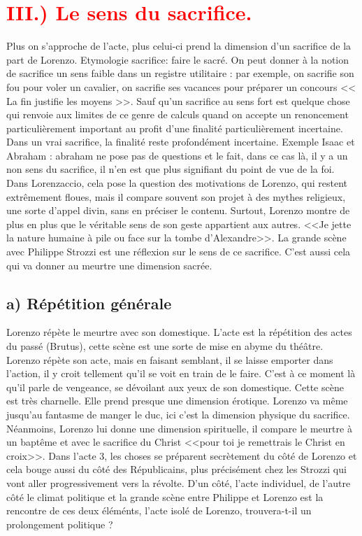 \documentclass[12pt]{article}
\begin{document}
\section*{\textcolor{red}{III.) Le sens du sacrifice.}}
Plus on s'approche de l'acte, plus celui-ci prend la dimension d'un sacrifice de la part de Lorenzo.
Etymologie sacrifice: faire le sacré. On peut donner à la notion de sacrifice un sens faible dans un registre utilitaire : par exemple, on sacrifie son fou pour voler un cavalier, on sacrifie ses vacances pour préparer un concours << La fin justifie les moyens >>.
Sauf qu'un sacrifice au sens fort est quelque chose qui renvoie aux limites de ce genre de calculs quand on accepte un renoncement particulièrement important au profit d'une finalité particulièrement incertaine.
Dans un vrai sacrifice, la finalité reste profondément incertaine.
Exemple Isaac et Abraham : abraham ne pose pas de questions et le fait, dans ce cas là, il y a un non sens du sacrifice, il n'en est que plus signifiant du point de vue de la foi.
Dans Lorenzaccio, cela pose la question des motivations de Lorenzo,  qui restent extrêmement floues, mais il compare souvent son projet à des mythes religieux, une sorte d'appel divin, sans en préciser le contenu.
Surtout, Lorenzo montre de plus en plus que le véritable sens de son geste appartient aux autres. <<Je jette la nature humaine à pile ou face sur la tombe d'Alexandre>>.
La grande scène avec Philippe Strozzi est une réflexion sur le sens de ce sacrifice.
C'est aussi cela qui va donner au meurtre une dimension sacrée.
\subsection*{a) Répétition générale}
Lorenzo répète le meurtre avec son domestique.
L'acte est la répétition des actes du passé (Brutus), cette scène est une sorte de mise en abyme du théâtre.
Lorenzo répète son acte, mais en faisant semblant, il se laisse emporter dans l'action, il y croit tellement qu'il se voit en train de le faire.
C'est à ce moment là qu'il parle de vengeance, se dévoilant aux yeux de son domestique. Cette scène est très charnelle.
Elle prend presque une dimension érotique.
Lorenzo va même jusqu'au fantasme de manger le duc, ici c'est la dimension physique du sacrifice.
Néanmoins, Lorenzo lui donne une dimension spirituelle, il compare le meurtre à un baptême et avec le sacrifice du Christ <<pour toi je remettrais le Christ en croix>>.
Dans l'acte 3, les choses se préparent secrètement du côté de Lorenzo et cela bouge aussi du côté des Républicains, plus précisément chez les Strozzi qui vont aller progressivement vers la révolte.
D'un côté, l'acte individuel, de l'autre côté le climat politique et la grande scène entre Philippe et Lorenzo est la rencontre de ces deux éléménts, l'acte isolé de Lorenzo, trouvera-t-il un prolongement politique ?
\end{document}
